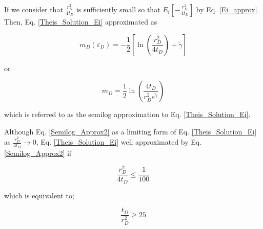 \documentclass{llncs}
\numberwithin{equation}{section}
\numberwithin{figure}{section}
\numberwithin{table}{section}
\begin{document}
    If we consider that $\frac{r_{D}^{2}}{4{{t}_{D}}}$ is sufficiently small so that  ${{E}_{i}}\left[ -\frac{r_{D}^{2}}{4{{t}_{D}}} \right]$  by Eq. \ref{Ei_approx}. Then, Eq. \ref{Theis_Solution_Ei}  approximated as

    \begin{equation}
        {{ m }_{D}}\left( {{\varepsilon }_{D}} \right)=-\frac{1}{2}\left[ \ln \left( \frac{r_{D}^{2}}{4{{t}_{D}}} \right)+\widetilde{\gamma } \right]
        \label{Semilog_Approx1}
    \end{equation}

    or

    \begin{equation}
        {{ m }_{D}}=\frac{1}{2}\ln \left( \frac{4{{t}_{D}}}{r_{D}^{2}{{e}^{\widetilde{\gamma }}}} \right)
        \label{Semilog_Approx2}
    \end{equation}

    which is referred to as the semilog approximation to Eq. \ref{Theis_Solution_Ei}.

    Although Eq. \ref{Semilog_Approx2}  as a limiting form of Eq. \ref{Theis_Solution_Ei} as $\frac{r_{D}^{2}}{4{{t}_{D}}}\to 0$, Eq. \ref{Theis_Solution_Ei}  well approximated by Eq. \ref{Semilog_Approx2} if

    \begin{equation*}
        \frac{r_{D}^{2}}{4{{t}_{D}}}\le \frac{1}{100}
    \end{equation*}

    which is equivalent to;

    \begin{equation}
        \frac{{{t}_{D}}}{r_{D}^{2}}\ge 25
        \label{Semilog_Approx2}
    \end{equation}
\end{document}
